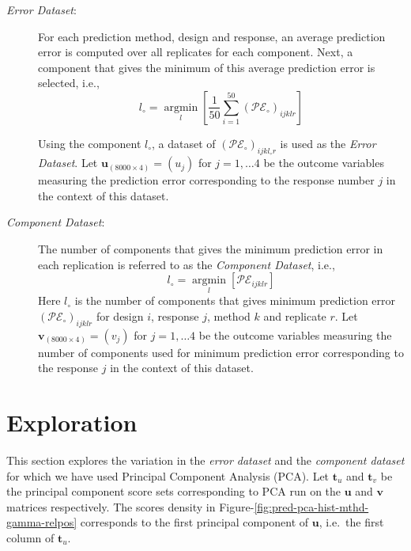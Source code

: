 \documentclass[review]{elsarticle}
\begin{document}
\begin{description}
\item[\emph{Error Dataset}:]
For each prediction method, design and response, an average prediction error is computed over all replicates for each component. Next, a component that gives the minimum of this average prediction error is selected, i.e.,
\begin{equation}
  l_\circ = \operatorname*{argmin}_{l}\left[\frac{1}{50}\sum_{i=1}^{50}{\left(\mathcal{PE}_\circ\right)_{ijklr}}\right]
  \label{eq:min-pred}
  \end{equation}

Using the component \(l_\circ\), a dataset of
\(\left(\mathcal{PE}_\circ\right)_{ijkl_\circ r}\) is used as the \emph{Error Dataset}.
Let \(\mathbf{u}_{(8000 \times 4)} = (u_j)\) for \(j = 1, \ldots 4\) be the outcome variables measuring the prediction error corresponding to the response number \(j\) in the context of this dataset.
\item[\emph{Component Dataset}:]
The number of components that gives the minimum prediction error in each replication is referred to as the \emph{Component Dataset}, i.e.,
\begin{equation}
  l_{\circ} = \operatorname*{argmin}_{l}\left[\mathcal{PE}_{ijklr}\right]
  \label{eq:min-comp}
  \end{equation}
Here \(l_\circ\) is the number of components that gives minimum prediction error \(\left(\mathcal{PE}_\circ\right)_{ijklr}\) for design \(i\), response \(j\), method \(k\) and replicate \(r\). Let \(\mathbf{v}_{(8000 \times 4)} = (v_j)\) for \(j = 1, \ldots 4\) be the outcome variables measuring the number of components used for minimum prediction error corresponding to the response \(j\) in the context of this dataset.
\end{description}

\hypertarget{exploration}{%
\section{Exploration}\label{exploration}}

This section explores the variation in the \emph{error dataset} and the \emph{component dataset} for which we have used Principal Component Analysis (PCA). Let \(\mathbf{t}_u\) and \(\mathbf{t}_v\) be the principal component score sets corresponding to PCA run on the \(\mathbf{u}\) and \(\mathbf{v}\) matrices respectively. The scores density in Figure-\ref{fig:pred-pca-hist-mthd-gamma-relpos} corresponds to the first principal component of \(\mathbf{u}\), i.e.~the first column of \(\mathbf{t}_u\).
\end{document}
